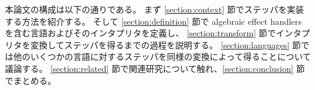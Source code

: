 本論文の構成は以下の通りである。
まず \ref{section:context} 節でステッパを実装する方法を紹介する。
そして \ref{section:definition} 節で algebraic effect handlers を含む言語およびそのインタプリタを定義し、
\ref{section:transform} 節でインタプリタを変換してステッパを得るまでの過程を説明する。
\ref{section:languages} 節では他のいくつかの言語に対するステッパを同様の変換によって得ることについて議論する。
\ref{section:related} 節で関連研究について触れ、\ref{section:conclusion} 節でまとめる。
